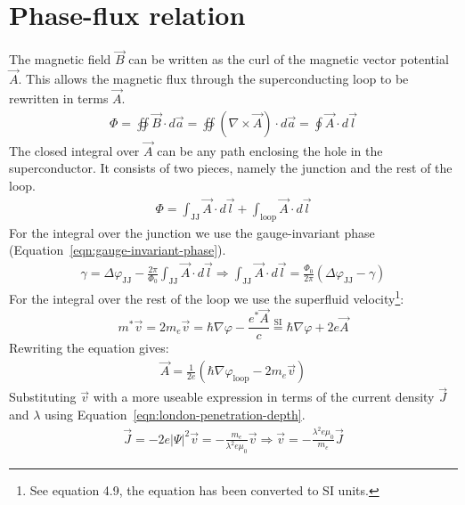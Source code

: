 \section{Phase-flux relation}
\label{app:derivation-phase-flux-relation}
The magnetic field $\vec{B}$ can be written as the curl of the magnetic vector potential $\vec{A}$. This allows the magnetic flux through the superconducting loop to be rewritten in terms $\vec{A}$.
\begin{align}
	\Phi = \oiint \vec{B} \cdot d\vec{a} = \oiint \left(\nabla \times \vec{A}\right) \cdot d\vec{a} = \oint \vec{A} \cdot d\vec{l}
\end{align}
The closed integral over $\vec{A}$ can be any path enclosing the hole in the superconductor. It consists of two pieces, namely the junction and the rest of the loop.
\begin{align}
	\Phi = \int_{\text{JJ}} \vec{A} \cdot d\vec{l} + \int_{\text{loop}} \vec{A} \cdot d\vec{l}
	\label{eqn:magnetic-potential-integral}
\end{align}
For the integral over the junction we use the gauge-invariant phase (Equation~\ref{eqn:gauge-invariant-phase}).
\begin{align}
	\gamma = \Delta\varphi_{\text{JJ}} - \frac{2\pi}{\Phi_0}\int_{\text{JJ}}\vec{A} \cdot d\vec{l} \Rightarrow \int_{\text{JJ}}\vec{A} \cdot d\vec{l} = \frac{\Phi_0}{2\pi} \left(\Delta\varphi_{\text{JJ}} - \gamma\right)
\end{align}
For the integral over the rest of the loop we use the superfluid velocity\footnote{See  equation 4.9, the equation has been converted to SI units.}:
\begin{equation}
	m^*\vec{v} = 2m_e\vec{v} = \hbar \nabla \varphi - \frac{e^*\vec{A}}{c} \stackrel{\text{SI}}{=} \hbar \nabla \varphi + 2e\vec{A}
	\label{eqn:superfluid-velocity}
\end{equation}
Rewriting the equation gives:
\begin{align}
	\vec{A} = \frac{1}{2e}\left(\hbar \nabla \varphi_{\text{loop}} - 2m_e\vec{v}\right)
\end{align}
Substituting $\vec{v}$ with a more useable expression in terms of the current density $\vec{J}$ and $\lambda$ using Equation~\ref{eqn:london-penetration-depth}.
\begin{align}
	\vec{J} = -2e|\Psi|^2\vec{v} = -\frac{m_e}{\lambda^2e\mu_0}\vec{v} \Rightarrow \vec{v} = -\frac{\lambda^2e\mu_0}{m_e}\vec{J}
\end{align}
